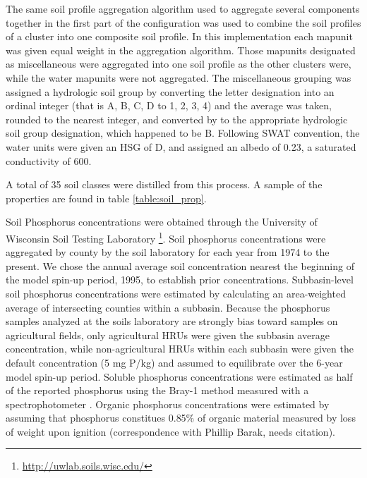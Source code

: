 The same soil profile aggregation algorithm \citep{beaudette_algorithms_2013}
used to aggregate several components together in the first part of the
configuration was used to combine the soil profiles of a cluster into one
composite soil profile. In this implementation each mapunit was given equal
weight in the aggregation algorithm. Those mapunits designated as miscellaneous
were aggregated into one soil profile as the other clusters were, while the
water mapunits were not aggregated. The miscellaneous  grouping was assigned a
hydrologic soil group by converting the letter designation into an ordinal
integer (that is A, B, C, D to 1, 2, 3, 4) and the average was taken, rounded to
the nearest integer, and converted by to the appropriate hydrologic soil group
designation, which happened to be B. Following SWAT convention, the water units
were given an HSG of D, and assigned an albedo of 0.23, a saturated conductivity
of 600.

A total of 35 soil classes were distilled from this process. A sample of the
properties are found in table \ref{table:soil_prop}.


Soil Phosphorus concentrations were obtained through the University of Wisconsin
Soil Testing Laboratory \footnote{\url{http://uwlab.soils.wisc.edu/}}. Soil
phosphorus concentrations were aggregated by county by the soil laboratory for
each year from 1974 to the present. We chose the annual average soil
concentration nearest the beginning of the model spin-up period, 1995, to
establish prior concentrations. Subbasin-level soil phosphorus concentrations
were estimated by calculating an area-weighted average of intersecting counties
within a subbasin.
Because the phosphorus samples analyzed at the soils laboratory are strongly
bias toward samples on agricultural fields, only agricultural HRUs were given
the subbasin average concentration, while non-agricultural HRUs within each
subbasin were given the default concentration (5 mg P/kg) and assumed to
equilibrate over the 6-year model spin-up period. Soluble phosphorus
concentrations were estimated as half of the reported phosphorus using the
Bray-1 method measured with a spectrophotometer \citep{vadas_validating_2010}.
Organic phosphorus concentrations were estimated by assuming that phosphorus
constitues 0.85\% of organic material measured by loss of weight upon ignition
(correspondence with Phillip Barak, needs citation).
